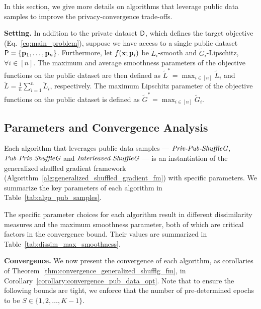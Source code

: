 In this section, we give more details on algorithms that leverage public data samples to improve the privacy-convergence trade-offs.

\textbf{Setting.} 
In addition to the private dataset ${\mathsf{D}}$, which defines the target objective (Eq.~\ref{eq:main_problem}), suppose we have access to a single public dataset ${\mathsf{P}} = \{{\mathbf{p}}_1, \dots, {\mathbf{p}}_n\}$. Furthermore, let $f({\mathbf{x}}; {\mathbf{p}}_i)$ be $\widetilde{L}_i$-smooth and $\widetilde{G}_i$-Lipschitz, $\forall i\in [n]$. The maximum and average smoothness parameters of the objective functions on the public dataset are then defined as $\widetilde{L}^{*} = \max_{i\in[n]}\widetilde{L}_i$ and $\widetilde{L} = \frac{1}{n}\sum_{i=1}^{n} \widetilde{L}_i$, respectively. 
The maximum Lipschitz parameter of the objective functions on the public dataset is defined as $\widetilde{G}^{*} = \max_{i\in [n]} \widetilde{G}_i$.

\subsection{Parameters and Convergence Analysis}
\label{subsec:appendix_algo_pub_data_param_convergence}

Each algorithm that leverages public data samples --- $\textit{Priv-Pub-ShuffleG}$, $\textit{Pub-Priv-ShuffleG}$ and $\textit{Interleaved-ShuffleG}$ --- is an instantiation of the generalized shuffled gradient framework (Algorithm~\ref{alg:generalized_shuffled_gradient_fm}) with specific parameters.
We summarize the key parameters of each algorithm in Table~\ref{tab:algo_pub_samples}. 

The specific parameter choices for each algorithm result in different dissimilarity measures and the maximum smoothness parameter, both of which are critical factors in the convergence bound. Their values are summarized in Table~\ref{tab:dissim_max_smoothness}.

\textbf{Convergence.} We now present the convergence of each algorithm, as corollaries of Theorem~\ref{thm:convergence_generalized_shufflg_fm}, in Corollary~\ref{corollary:convergence_pub_data_opt}.
Note that to ensure the following bounds are tight, we enforce that the number of pre-determined epochs to be $S \in \{1,2,\dots,K-1\}$.


